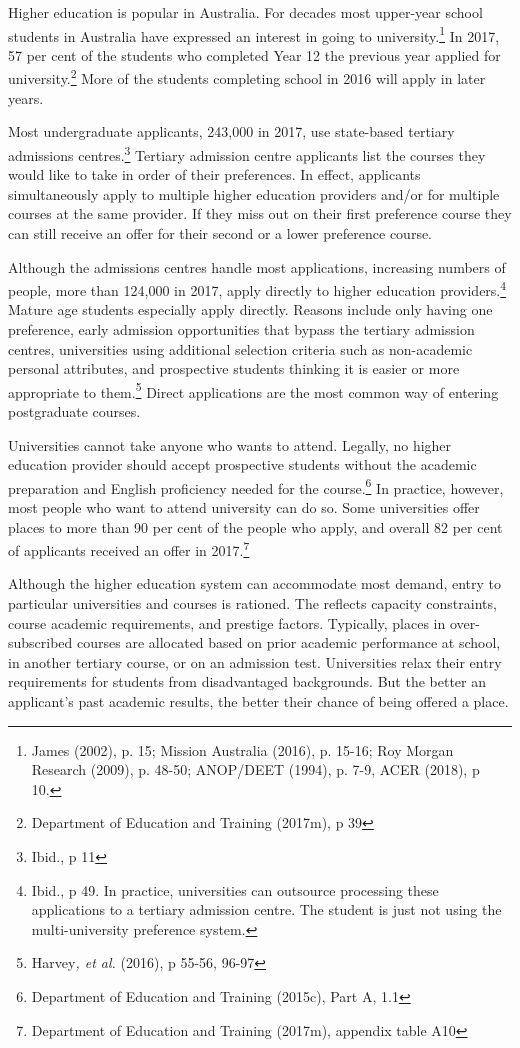 \documentclass[]{book}
\begin{document}
Higher education is popular in Australia. For decades most upper-year school students in Australia have expressed an interest in going to university.\footnote{James (2002), p. 15; Mission Australia (2016), p. 15-16; Roy Morgan Research (2009), p. 48-50; ANOP/DEET (1994), p. 7-9, ACER (2018), p 10.} In 2017, 57 per cent of the students who completed Year 12 the previous year applied for university.\footnote{Department of Education and Training (2017m), p 39} More of the students completing school in 2016 will apply in later years.

Most undergraduate applicants, 243,000 in 2017, use state-based tertiary admissions centres.\footnote{Ibid., p 11} Tertiary admission centre applicants list the courses they would like to take in order of their preferences. In effect, applicants simultaneously apply to multiple higher education providers and/or for multiple courses at the same provider. If they miss out on their first preference course they can still receive an offer for their second or a lower preference course.

Although the admissions centres handle most applications, increasing numbers of people, more than 124,000 in 2017, apply directly to higher education providers.\footnote{Ibid., p 49. In practice, universities can outsource processing these applications to a tertiary admission centre. The student is just not using the multi-university preference system.} Mature age students especially apply directly. Reasons include only having one preference, early admission opportunities that bypass the tertiary admission centres, universities using additional selection criteria such as non-academic personal attributes, and prospective students thinking it is easier or more appropriate to them.\footnote{Harvey\emph{, et al.} (2016), p 55-56, 96-97} Direct applications are the most common way of entering postgraduate courses.

Universities cannot take anyone who wants to attend. Legally, no higher education provider should accept prospective students without the academic preparation and English proficiency needed for the course.\footnote{Department of Education and Training (2015c), Part A, 1.1} In practice, however, most people who want to attend university can do so. Some universities offer places to more than 90 per cent of the people who apply, and overall 82 per cent of applicants received an offer in 2017.\footnote{Department of Education and Training (2017m), appendix table A10}

Although the higher education system can accommodate most demand, entry to particular universities and courses is rationed. The reflects capacity constraints, course academic requirements, and prestige factors. Typically, places in over-subscribed courses are allocated based on prior academic performance at school, in another tertiary course, or on an admission test. Universities relax their entry requirements for students from disadvantaged backgrounds. But the better an applicant's past academic results, the better their chance of being offered a place.
\end{document}
